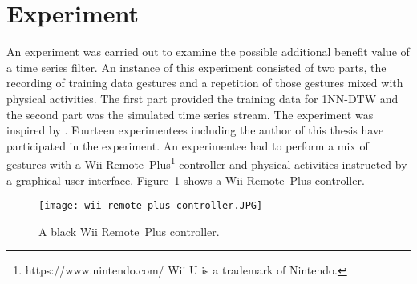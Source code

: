 \section{Experiment} \label{experiment}
An experiment was carried out to examine the possible additional benefit value of a time series filter. An instance of
this experiment consisted of two parts, the recording of training data gestures and a repetition of those gestures mixed
with physical activities. The first part provided the training data for 1NN-DTW and the second part was the simulated
time series stream. The experiment was inspired by \cite{liu2009uwave}. Fourteen experimentees including the author of
this thesis have participated in the experiment. An experimentee had to perform a mix of gestures with a Wii
Remote\texttrademark~Plus\footnote{https://www.nintendo.com/ Wii U is a trademark of Nintendo.} controller and physical
activities instructed by a graphical user interface. Figure~\ref{fig:wii-remote} shows a Wii Remote\texttrademark~Plus
controller.
\begin{figure}
    \begin{center}
        \texttt{[image: wii-remote-plus-controller.JPG]}
    \end{center}
    \caption{A black Wii Remote\texttrademark~Plus controller.}
    \label{fig:wii-remote}
\end{figure}





